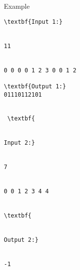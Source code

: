 Example
\begin{verbatim}
\textbf{Input 1:}


11


0 0 0 0 1 2 3 0 0 1 2

\textbf{Output 1:}
01110112101


 \textbf{


Input 2:}


7


0 0 1 2 3 4 4


\textbf{


Output 2:}


-1\end{verbatim}